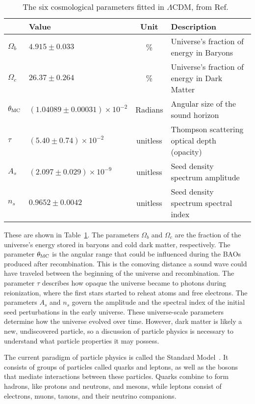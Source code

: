   \begin{table}[]
    \centering
    \caption[6 Cosmological Parameters]{
      The six cosmological parameters fitted in $\Lambda$CDM, from Ref.~\cite{planck_dm_limit}}
    \label{tab:six_params}
    \begin{tabular}{llcl}
               & \textbf{Value}                 & \textbf{Unit} & \textbf{Description} \\
    \hline 
    $\Omega_b$ & $ 4.915  \pm0.033                 $ & \%   & Universe's fraction of energy in Baryons \\
    $\Omega_c$ & $ 26.37  \pm0.264                 $ & \%   & Universe's fraction of energy in Dark Matter \\
    $\theta_{\textrm{MC}}$ & $(1.04089\pm0.00031)\times 10^{-2}$ & Radians  & Angular size of the sound horizon \\
    $\tau$     & $(5.40   \pm0.74   )\times 10^{-2}$ & unitless & Thompson scattering optical depth (opacity)\\
    $A_s$      & $(2.097  \pm0.029  )\times 10^{-9}$ & unitless & Seed density spectrum amplitude \\
    $n_s$      & $ 0.9652 \pm0.0042                $ & unitless & Seed density spectrum spectral index \\
    \hline 
    \end{tabular}
  \end{table}
  
  These are shown in Table~\ref{tab:six_params}.
  The parameters $\Omega_b$ and $\Omega_c$ are the fraction of the universe's energy stored in baryons and cold dark matter, respectively.
  The parameter $\theta_{\textrm{MC}}$ is the angular range that could be influenced during the BAOs produced after recombination.
  This is the comoving distance a sound wave could have traveled between the beginning of the universe and recombination.
  The parameter $\tau$ describes how opaque the universe became to photons during reionization, where the first stars started to reheat atoms and free electrons.
  The parameters $A_s$ and $n_s$ govern the amplitude and the spectral index of the initial seed perturbations in the early universe.
  These universe-scale parameters determine how the universe evolved over time.
  However, dark matter is likely a new, undiscovered particle,  so a discussion of particle physics is necessary to understand what particle properties it may possess.
  

  The current paradigm of particle physics is called the Standard Model~\cite{standardmodel}.
  It consists of groups of particles called quarks and leptons, as well as the bosons that mediate interactions between these particles.
  Quarks combine to form hadrons, like protons and neutrons, and mesons, while leptons consist of electrons, muons, tauons, and their neutrino companions.

